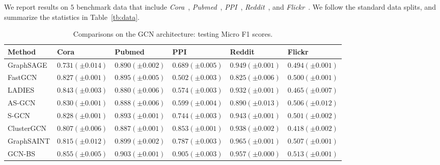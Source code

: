 \documentclass{article}
\begin{document}
We report results on $5$ benchmark data that include
\textit{Cora}~\cite{sen2008collective}, 
\textit{Pubmed}~\cite{sen2008collective},
\textit{PPI}~\cite{hamilton2017inductive},
\textit{Reddit}~\cite{hamilton2017inductive},
and \textit{Flickr}~\cite{zeng2019graphsaint}.
We follow the standard data splits,
and summarize the statistics in Table~\ref{tb:data}.

{\tiny
\begin{table*}[h]
\caption{Comparisons on the GCN architecture: testing Micro F1 scores.}
\label{tb:bench-gcn}
\begin{center}
\begin{tabular}{llllll}
\toprule
\textbf{Method}  &\textbf{Cora} &\textbf{Pubmed} &\textbf{PPI}& \textbf{Reddit}& \textbf{Flickr} \\
\midrule
GraphSAGE & $0.731 (\pm 0.014)$ &$0.890 (\pm 0.002)$ & $0.689(\pm 0.005)$ & $0.949 (\pm 0.001)$ & $0.494 (\pm 0.001)$ \\
FastGCN & $0.827 (\pm 0.001)$ &$0.895 (\pm 0.005)$ & $0.502(\pm 0.003)$ & $0.825 (\pm 0.006)$ & $0.500 (\pm 0.001)$ \\
LADIES & $0.843 (\pm 0.003)$ &$0.880 (\pm 0.006)$ & $0.574(\pm 0.003)$ & $0.932 (\pm 0.001)$ & $0.465 (\pm 0.007)$ \\
AS-GCN & $0.830 (\pm 0.001)$ &$0.888 (\pm 0.006)$ & $0.599(\pm 0.004)$ & $0.890 (\pm 0.013)$ & $0.506 (\pm 0.012)$ \\
S-GCN & $0.828 (\pm 0.001)$ &$0.893 (\pm 0.001)$ & $0.744(\pm 0.003)$ & $0.943 (\pm 0.001)$ & $0.501 (\pm 0.002)$ \\
ClusterGCN & $0.807 (\pm 0.006)$ &$0.887 (\pm 0.001)$ & $0.853(\pm 0.001)$ & $0.938 (\pm 0.002)$ & $0.418 (\pm 0.002)$ \\
GraphSAINT & $0.815 (\pm 0.012)$ &$0.899 (\pm 0.002)$ & $0.787(\pm 0.003)$ & $\bm{0.965} (\pm 0.001)$ & $0.507 (\pm 0.001)$ \\
\midrule
GCN-BS & $\bm{0.855} (\pm 0.005)$ &$\bm{0.903} (\pm 0.001)$ & $\bm{0.905}(\pm 0.003)$ & $0.957 (\pm 0.000)$ & $\bm{0.513} (\pm 0.001)$ \\
\bottomrule
\end{tabular}
\end{center}
\end{table*}
}
\end{document}
